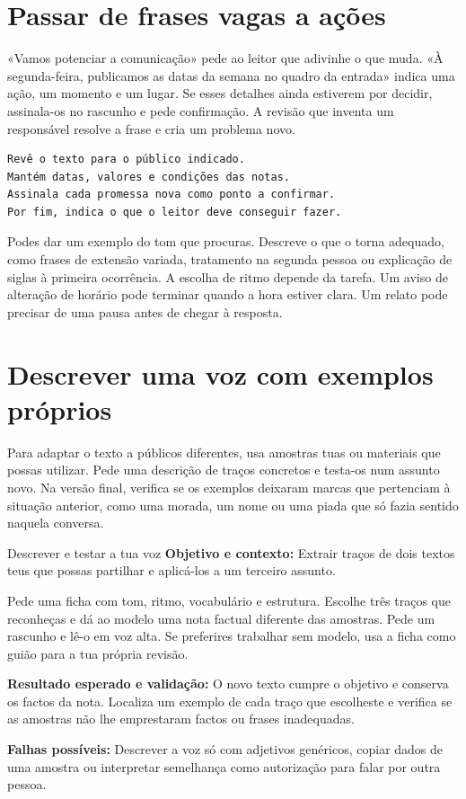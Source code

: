 \section{Passar de frases vagas a ações}

«Vamos potenciar a comunicação» pede ao leitor que adivinhe o que muda. «À segunda-feira, publicamos as datas da semana no quadro da entrada» indica uma ação, um momento e um lugar. Se esses detalhes ainda estiverem por decidir, assinala-os no rascunho e pede confirmação. A revisão que inventa um responsável resolve a frase e cria um problema novo.

\begin{lstlisting}
Revê o texto para o público indicado.
Mantém datas, valores e condições das notas.
Assinala cada promessa nova como ponto a confirmar.
Por fim, indica o que o leitor deve conseguir fazer.
\end{lstlisting}

Podes dar um exemplo do tom que procuras. Descreve o que o torna adequado, como frases de extensão variada, tratamento na segunda pessoa ou explicação de siglas à primeira ocorrência. A escolha de ritmo depende da tarefa. Um aviso de alteração de horário pode terminar quando a hora estiver clara. Um relato pode precisar de uma pausa antes de chegar à resposta.

\section{Descrever uma voz com exemplos próprios}

Para adaptar o texto a públicos diferentes, usa amostras tuas ou materiais que possas utilizar. Pede uma descrição de traços concretos e testa-os num assunto novo. Na versão final, verifica se os exemplos deixaram marcas que pertenciam à situação anterior, como uma morada, um nome ou uma piada que só fazia sentido naquela conversa.

\begin{promptlabbox}{Descrever e testar a tua voz}
\textbf{Objetivo e contexto:} Extrair traços de dois textos teus que possas partilhar e aplicá-los a um terceiro assunto.

Pede uma ficha com tom, ritmo, vocabulário e estrutura. Escolhe três traços que reconheças e dá ao modelo uma nota factual diferente das amostras. Pede um rascunho e lê-o em voz alta. Se preferires trabalhar sem modelo, usa a ficha como guião para a tua própria revisão.

\textbf{Resultado esperado e validação:} O novo texto cumpre o objetivo e conserva os factos da nota. Localiza um exemplo de cada traço que escolheste e verifica se as amostras não lhe emprestaram factos ou frases inadequadas.

\textbf{Falhas possíveis:} Descrever a voz só com adjetivos genéricos, copiar dados de uma amostra ou interpretar semelhança como autorização para falar por outra pessoa.
\end{promptlabbox}

